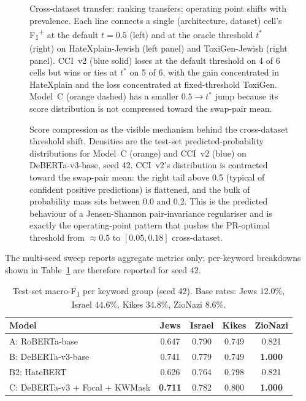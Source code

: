\documentclass[10pt,a4paper]{article}
\newcommand{\modelA}{RoBERTa-base}
\newcommand{\modelB}{DeBERTa-v3-base}
\newcommand{\modelBB}{HateBERT}
\newcommand{\modelC}{DeBERTa-v3 + Focal + KWMask}
\begin{document}
\begin{figure}[h]
\centering
\caption{Cross-dataset transfer: ranking transfers; operating point shifts with prevalence. Each line connects a single (architecture, dataset) cell's F\textsubscript{1}\textsuperscript{+} at the default $t = 0.5$ (left) and at the oracle threshold $t^*$ (right) on HateXplain-Jewish (left panel) and ToxiGen-Jewish (right panel). CCI~v2 (blue solid) loses at the default threshold on 4 of 6 cells but wins or ties at $t^*$ on 5 of 6, with the gain concentrated in HateXplain and the loss concentrated at fixed-threshold ToxiGen. Model~C (orange dashed) has a smaller $0.5 \to t^*$ jump because its score distribution is not compressed toward the swap-pair mean.}
\label{fig:panel_cross_dataset}
\end{figure}

\begin{figure}[h]
\centering
\caption{Score compression as the visible mechanism behind the cross-dataset threshold shift. Densities are the test-set predicted-probability distributions for Model~C (orange) and CCI~v2 (blue) on DeBERTa-v3-base, seed 42. CCI~v2's distribution is contracted toward the swap-pair mean: the right tail above 0.5 (typical of confident positive predictions) is flattened, and the bulk of probability mass sits between 0.0 and 0.2. This is the predicted behaviour of a Jensen-Shannon pair-invariance regulariser and is exactly the operating-point pattern that pushes the PR-optimal threshold from $\approx 0.5$ to $[0.05, 0.18]$ cross-dataset.}
\label{fig:panel_compression}
\end{figure}

The multi-seed sweep reports aggregate metrics only; per-keyword breakdowns shown in Table~\ref{tab:per_keyword} are therefore reported for seed 42.

\begin{table}[t]
\centering
\caption{Test-set macro-F\textsubscript{1} per keyword group (seed 42). Base rates: Jews $12.0\%$, Israel $44.6\%$, Kikes $34.8\%$, ZioNazi $8.6\%$.}
\label{tab:per_keyword}
\begin{tabular}{@{}lcccc@{}}
\toprule
\textbf{Model} & \textbf{Jews} & \textbf{Israel} & \textbf{Kikes} & \textbf{ZioNazi} \\
\midrule
A: \modelA     & 0.647 & 0.790 & 0.749 & 0.821 \\
B: \modelB     & 0.741 & 0.779 & 0.749 & \textbf{1.000} \\
B2: \modelBB   & 0.626 & 0.764 & 0.798 & 0.821 \\
C: \modelC     & \textbf{0.711} & 0.782 & 0.800 & \textbf{1.000} \\
\bottomrule
\end{tabular}
\end{table}
\end{document}

